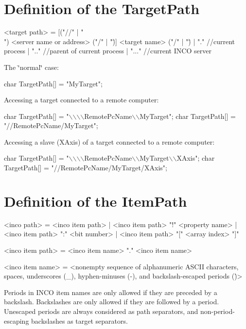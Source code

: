 \hypertarget{incodefinitions_targetpath}{}\section{Definition of the Target\+Path}\label{incodefinitions_targetpath}
\begin{DoxyVerb}<target path> = [("//" | "\\") <server name or address> ("/" | "\")] {<target name> ("/" | "\")}
              | "."       //current process
              | ".."      //parent of current process
              | "..."     //current INCO server
\end{DoxyVerb}


The \char`\"{}normal\char`\"{} case\+: 
\begin{DoxyCode}
\textcolor{keywordtype}{char} TargetPath[] = \textcolor{stringliteral}{"MyTarget"};
\end{DoxyCode}
 Accessing a target connected to a remote computer\+: 
\begin{DoxyCode}
\textcolor{keywordtype}{char} TargetPath[] = \textcolor{stringliteral}{"\(\backslash\)\(\backslash\)\(\backslash\)\(\backslash\)RemotePcName\(\backslash\)\(\backslash\)MyTarget"};
\textcolor{keywordtype}{char} TargetPath[] = \textcolor{stringliteral}{"//RemotePcName/MyTarget"};
\end{DoxyCode}
 Accessing a slave (X\+Axis) of a target connected to a remote computer\+: 
\begin{DoxyCode}
\textcolor{keywordtype}{char} TargetPath[] = \textcolor{stringliteral}{"\(\backslash\)\(\backslash\)\(\backslash\)\(\backslash\)RemotePcName\(\backslash\)\(\backslash\)MyTarget\(\backslash\)\(\backslash\)XAxis"};
\textcolor{keywordtype}{char} TargetPath[] = \textcolor{stringliteral}{"//RemotePcName/MyTarget/XAxis"};
\end{DoxyCode}
\hypertarget{incodefinitions_incoitemname}{}\section{Definition of the Item\+Path}\label{incodefinitions_incoitemname}
\begin{DoxyVerb}<inco path> = <inco item path>
            | <inco item path> "!" <property name>
            | <inco item path> ":" <bit number>
            | <inco item path> "[" <array index> "]"
\end{DoxyVerb}
 \begin{DoxyVerb}<inco item path> = <inco item name> {"." <inco item name>}
\end{DoxyVerb}
 \begin{DoxyVerb}<inco item name> = <nonempty sequence of alphanumeric ASCII characters, spaces, underscores (_), hyphen-minuses (-), and backslash-escaped periods (\.)>
\end{DoxyVerb}
 Periods in I\+N\+CO item names are only allowed if they are preceded by a backslash. Backslashes are only allowed if they are followed by a period. Unescaped periods are always considered as path separators, and non-\/period-\/escaping backslashes as target separators.

